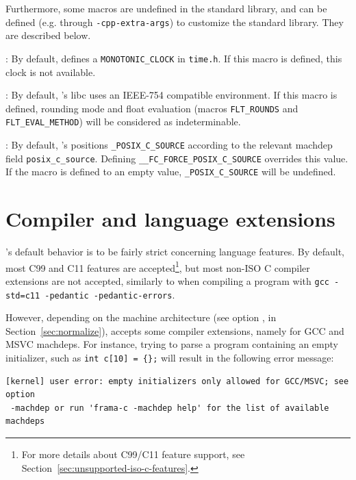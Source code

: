 Furthermore, some macros are undefined in the standard library, and can
be defined (e.g. through \lstinline|-cpp-extra-args|) to customize the \FramaC
standard library. They are described below.

\begin{description}
\item {}: By default, \FramaC defines
  a \lstinline|MONOTONIC_CLOCK| in \lstinline|time.h|. If this macro is defined,
  this clock is not available.
\item {}: By default, \FramaC's libc
  uses an IEEE-754 compatible environment. If this macro is defined,
  rounding mode and float evaluation
  (macros \lstinline|FLT_ROUNDS| and \lstinline|FLT_EVAL_METHOD|) will be
  considered as indeterminable.
\item {}: By default, \FramaC's positions
  \lstinline|_POSIX_C_SOURCE| according to the relevant machdep field
  \lstinline|posix_c_source|. Defining
  \lstinline|__FC_FORCE_POSIX_C_SOURCE| overrides this value. If the macro is
  defined to an empty value, \lstinline|_POSIX_C_SOURCE| will be undefined.
\end{description}

\section{Compiler and language extensions}\label{sec:extensions}

\FramaC's default behavior is to be fairly strict concerning language features.
By default, most C99 and C11 features are accepted\footnote{For more details
about C99/C11 feature support, see
Section~\ref{sec:unsupported-iso-c-features}.}, but most non-ISO C compiler
extensions are not accepted, similarly to when compiling a program with
\verb+gcc -std=c11 -pedantic -pedantic-errors+.

However, depending on the machine architecture (see option
, in Section~\ref{sec:normalize}),
\FramaC accepts some compiler extensions, namely for GCC and MSVC machdeps.
For instance, trying to parse a program containing an empty initializer,
such as \verb+int c[10] = {};+ will result in the following error message:

\begin{verbatim}
[kernel] user error: empty initializers only allowed for GCC/MSVC; see option
 -machdep or run 'frama-c -machdep help' for the list of available machdeps
\end{verbatim}


